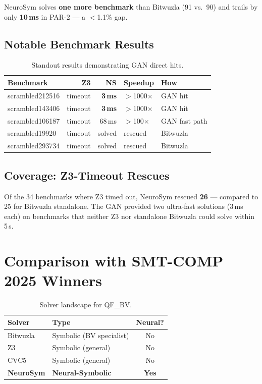 \documentclass[10pt,twocolumn]{article}
\begin{document}
\noindent NeuroSym solves \textbf{one more benchmark} than Bitwuzla
(91 vs.\ 90) and trails by only \textbf{10\,ms} in PAR-2 —
a $<$1.1\% gap.

\subsection*{Notable Benchmark Results}

\begin{table}[h]
\centering\small
\caption{Standout results demonstrating GAN direct hits.}
\setlength{\tabcolsep}{3pt}
\begin{tabular}{@{}lrrll@{}}
\toprule
\textbf{Benchmark} & \textbf{Z3} & \textbf{NS} &
  \textbf{Speedup} & \textbf{How} \\
\midrule
scrambled212516 & timeout & \textbf{3\,ms}  & $>$1000$\times$ & GAN hit \\
scrambled143406 & timeout & \textbf{3\,ms}  & $>$1000$\times$ & GAN hit \\
scrambled106187 & timeout &  68\,ms & $>$100$\times$ & GAN fast path \\
scrambled19920  & timeout & solved  & rescued & Bitwuzla \\
scrambled293734 & timeout & solved  & rescued & Bitwuzla \\
\bottomrule
\end{tabular}
\end{table}

\subsection*{Coverage: Z3-Timeout Rescues}

\noindent Of the 34 benchmarks where Z3 timed out,
NeuroSym rescued \textbf{26} — compared to 25 for Bitwuzla standalone.
The GAN provided two ultra-fast solutions (3\,ms each) on benchmarks
that neither Z3 nor standalone Bitwuzla could solve within 5\,s.

\section{Comparison with SMT-COMP 2025 Winners}

\begin{table}[h]
\centering\small
\caption{Solver landscape for QF\_BV.}
\setlength{\tabcolsep}{4pt}
\begin{tabular}{@{}llc@{}}
\toprule
\textbf{Solver} & \textbf{Type} & \textbf{Neural?} \\
\midrule
Bitwuzla        & Symbolic (BV specialist)  & No  \\
Z3              & Symbolic (general)        & No  \\
CVC5            & Symbolic (general)        & No  \\
\textbf{NeuroSym} & \textbf{Neural-Symbolic} & \textbf{Yes} \\
\bottomrule
\end{tabular}
\end{table}
\end{document}

